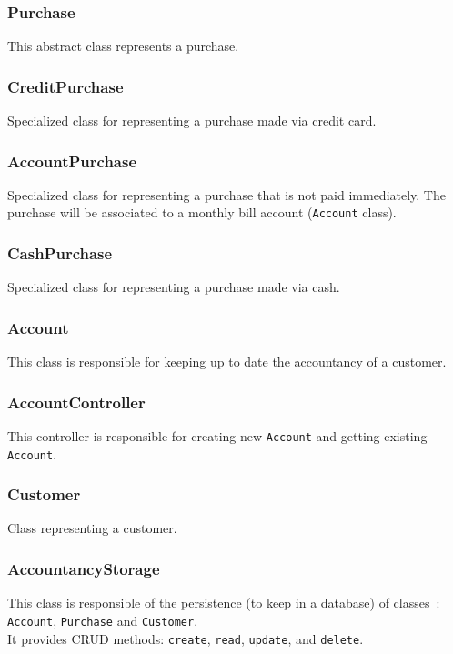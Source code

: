 \documentclass[11pt, a4paper]{article}
\newcommand{\settextlisting}{\lstset{ basicstyle=\small\ttfamily }}
\begin{document}
\subsubsection*{Purchase}
This abstract class represents a purchase.

\subsubsection*{CreditPurchase}
Specialized class for representing a purchase made via credit card.

\subsubsection*{AccountPurchase}
Specialized class for representing a purchase that is not paid immediately. The purchase will be associated to a monthly bill account (\lstinline|Account| class).

\subsubsection*{CashPurchase}
Specialized class for representing a purchase made via cash.

\subsubsection*{Account}
This class is responsible for keeping up to date the accountancy of a customer.

\subsubsection*{AccountController}
This controller is responsible for creating new \lstinline|Account| and getting existing \lstinline|Account|.

\subsubsection*{Customer}
Class representing a customer.

\subsubsection*{AccountancyStorage}
\settextlisting
This class is responsible of the persistence (to keep in a database) of \mbox{classes :} \lstinline|Account|, \lstinline|Purchase| and \lstinline|Customer|. \\
It provides CRUD methods: \lstinline|create|, \lstinline|read|, \lstinline|update|, and \lstinline|delete|.
\end{document}
